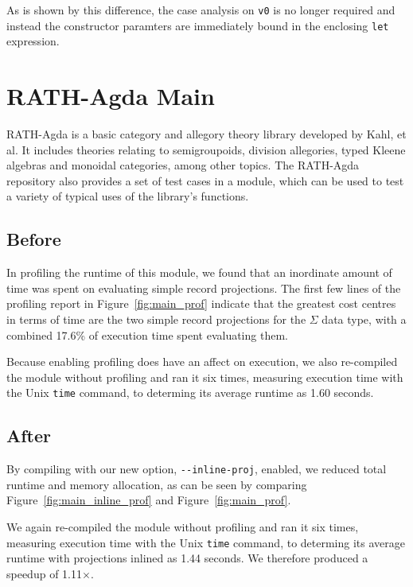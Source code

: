 As is shown by this difference, the case analysis on \lstinline{v0} is no longer required and instead the constructor paramters are immediately bound in the enclosing \lstinline{let} expression.


\section{RATH-Agda Main}
\label{sec:app_one}

RATH-Agda is a basic category and allegory theory library developed by Kahl, et al.\citep{Kahl-2017_RATH-Agda-2.2} It includes theories relating to semigroupoids, division allegories, typed Kleene algebras and monoidal categories, among other topics.\citep{Kahl-2017_RATH-Agda-2.2} The RATH-Agda repository also provides a set of test cases in a  module, which can be used to test a variety of typical uses of the library's functions.

\subsection{Before}

In profiling the runtime of this  module, we found that an inordinate amount of time was spent on evaluating simple record projections. The first few lines of the profiling report in Figure~\ref{fig:main_prof} indicate that the greatest cost centres in terms of time are the two simple record projections for the $\Sigma$ data type, with a combined 17.6\% of execution time spent evaluating them.

Because enabling profiling does have an affect on execution, we also re-compiled the module without profiling and ran it six times, measuring execution time with the Unix \texttt{time} command, to determing its average runtime as 1.60 seconds.



\subsection{After}

By compiling  with our new option, \texttt{-{}-inline-proj}, enabled, we reduced total runtime and memory allocation, as can be seen by comparing Figure~\ref{fig:main_inline_prof} and Figure~\ref{fig:main_prof}.

We again re-compiled the module without profiling and ran it six times, measuring execution time with the Unix \texttt{time} command, to determing its average runtime with projections inlined as 1.44 seconds. We therefore produced a speedup of 1.11$\times$.



